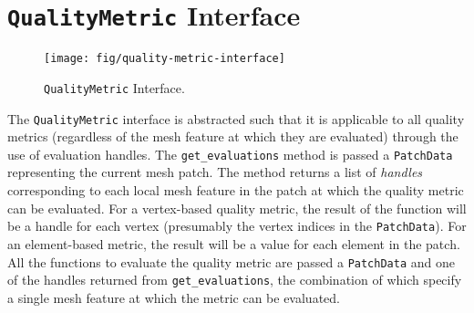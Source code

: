 \documentclass{article}
\begin{document}
\section{\texttt{QualityMetric} Interface}
\label{sec:qmiface}

\begin{figure}[htb]
\begin{center}
\texttt{[image: fig/quality-metric-interface]}
\caption{\texttt{QualityMetric} Interface.\label{fig:qmiface}}
\end{center}
\end{figure}

The \texttt{QualityMetric} interface is abstracted such that it is applicable to all quality metrics (regardless of the mesh feature at which they are evaluated) through the use of evaluation handles. The \texttt{get\_evaluations} method is passed a \texttt{PatchData} representing the current mesh patch.  The method returns a list of \emph{handles} corresponding to each local mesh feature in the patch at which the quality metric can be evaluated.  For a vertex-based quality metric, the result of the function will be a handle for each vertex (presumably the vertex indices in the \texttt{PatchData}).  For an element-based metric, the result will be a value for each element in the patch.  All the functions to evaluate the quality metric are passed a \texttt{PatchData} and one of the handles returned from \texttt{get\_evaluations}, the combination of which specify a single mesh feature at which the metric can be evaluated.
\end{document}
